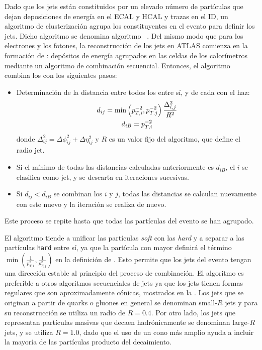 Dado que los jets están constituidos por un elevado número de partículas que dejan deposiciones de energía en el \ac{ECAL} y \ac{HCAL} y trazas en el \ac{ID}, un algoritmo de clusterizaci\'on agrupa los constituyentes en el evento para definir los jets. Dicho algoritmo se denomina algoritmo \antikt~\cite{AntiKtAlgorithm}. Del mismo modo que para los electrones y los fotones, la reconstrucción de los jets en \ac{ATLAS} comienza en la formación de \topos: depósitos de energía agrupados en las celdas de los calorímetros mediante un algoritmo de combinación secuencial. Entonces, el algoritmo \antikt combina los \topos con los siguientes pasos:
\begin{itemize}
    \item Determinaci\'on de la distancia entre todos los \topos entre sí, y de cada \topo con el haz:
        \begin{gather}
            d_{ij} = \min \left( p_{T,i}^{-2}, p_{T,j}^{-2} \right) \frac{\Delta_{i,j}^2}{R^2}\\
            d_{iB} = p_{T,i}^{-2}
        \end{gather}
        donde \(\Delta_{ij}^2 = \Delta\phi_{ij}^2 + \Delta\eta_{ij}^2\) y \(R\) es un valor fijo del algoritmo, que define el radio jet.
    \item Si el mínimo de todas las distancias calculadas anteriormente es \(d_{iB}\), el \topo \(i\) se clasifica como jet, y se descarta en iteraciones sucesivas.
    \item Si \(d_{ij} < d_{iB}\) se combinan los \topos \(i\) y \(j\), todas las distancias se calculan nuevamente con este nuevo \topo y la iteración se realiza de nuevo.
\end{itemize}
Este proceso se repite hasta que todas las partículas del evento se han agrupado.

El algoritmo \antikt tiende a unificar las part\'iculas \textit{soft} con las \textit{hard} y a separar a las part\'iculas \texttt{hard} entre s\'i, ya que la partícula con mayor \pt definirá el término \(\min \left( \frac{1}{p_{T,i}^2}, \frac{1}{p_{T,j}^2}  \right)\) en la definición de \dij. Esto permite que los jets del evento tengan una dirección estable al principio del proceso de combinación. El algoritmo \antikt es preferible a otros algoritmos secuenciales de jets ya que los jets tienen formas regulares que son aproximadamente cónicas, mostrados en la \Fig{\ref{fig:objects:jets:antikt}}. Los jets que se originan a partir de quarks o gluones en general se denominan small-\(R\) jets y para su reconstrucción se utiliza un radio de \(R=0.4\). Por otro lado, los jets que representan partículas masivas que decaen hadrónicamente se denominan large-\(R\) jets, y se utiliza \(R=1.0\), dado que el uso de un cono más amplio ayuda a incluir la mayoría de las partículas producto del decaimiento.


